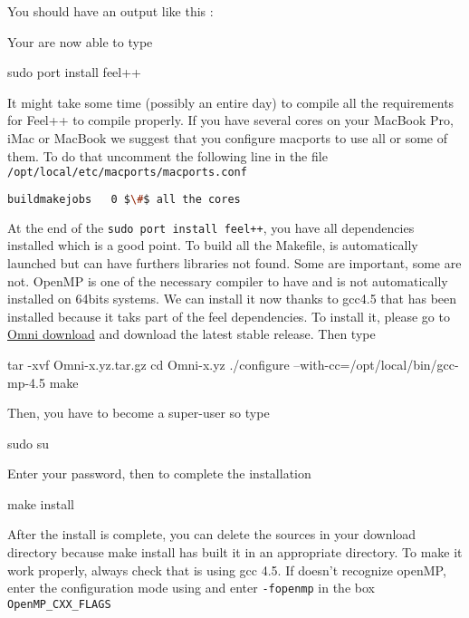 You should have an output like this : 
\begin{flushleft}
\end{flushleft}
Your are now able to type 
\begin{unixcom}
		sudo port install feel++
\end{unixcom}
It might take some time (possibly an entire day) to compile all the requirements for Feel++
to compile properly. If you have several cores on your MacBook Pro, iMac or MacBook
we suggest that you configure macports to use all or some of them.
To do that uncomment the following line in the file \newline \verb|/opt/local/etc/macports/macports.conf|
\begin{flushleft}
\begin{lstlisting}[language=sh]
buildmakejobs	0 $\#$ all the cores
\end{lstlisting} 
\end{flushleft}
At the end of the \verb|sudo port install feel++|, you have all dependencies installed which is a good point. To build all the Makefile, \cmake is automatically launched but can have furthers libraries not found. Some are important, some are not. OpenMP is one of the necessary compiler to have and is not automatically installed on 64bits systems. We can install it now thanks to gcc4.5 that has been installed because it taks part of the feel dependencies. To install it, please go to \href{http://www.hpcs.cs.tsukuba.ac.jp/omni-openmp/download/download-omni.html}{Omni download} and download the latest stable release. Then type
\begin{unixcom}
		tar -xvf Omni-x.yz.tar.gz 
		cd  Omni-x.yz
		./configure --with-cc=/opt/local/bin/gcc-mp-4.5
		make
\end{unixcom}
Then, you have to become a super-user so type
\begin{unixcom}
		sudo su
\end{unixcom}
Enter your password, then to complete the installation 
\begin{unixcom}
		make install
\end{unixcom}
After the install is complete, you can delete the sources in your download directory because make install has built it in an appropriate directory. To make it work properly, always check that \cmake is using gcc 4.5. If \cmake doesn't recognize openMP, enter the configuration mode using \ccmake and enter \verb|-fopenmp| in the box \verb|OpenMP_CXX_FLAGS|

